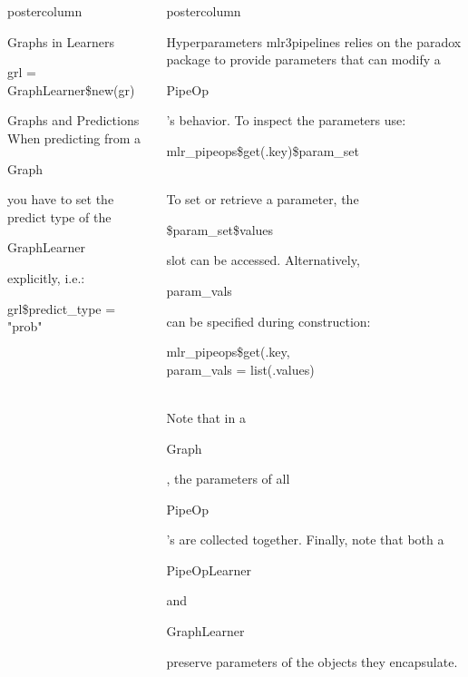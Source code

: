 \documentclass{beamer}
\newlength{\columnheight} %
\newcommand{\codeinline}[1]{\begin{codeboxinline}#1\end{codeboxinline}}
\begin{document}
\begin{frame}[fragile]{}
\begin{columns}
\begin{column}{.245\textwidth}
\begin{beamercolorbox}[center]{postercolumn}
\begin{minipage}{.98\textwidth}
{\begin{myblock}{Graphs in Learners}
              \begin{codebox}
                grl = GraphLearner\$new(gr)
              \end{codebox}
            \end{myblock}
            \begin{myblock}{Graphs and Predictions}
              When predicting from a \codeinline{Graph} you have to set the predict type of the \codeinline{GraphLearner} explicitly, i.e.:
              \begin{codebox}
                grl\$predict\_type = "prob"
              \end{codebox}
            \end{myblock}
						\vfill}
				\end{minipage}
			\end{beamercolorbox}
		\end{column}
    \begin{column}{.245\textwidth}
			\begin{beamercolorbox}[center]{postercolumn}
				\begin{minipage}{.98\textwidth}
					\parbox[t][\columnheight]{\textwidth}{
            \begin{myblock}{Hyperparameters}
              mlr3pipelines relies on the paradox package to provide parameters that can modify a \codeinline{PipeOp}'s behavior. To inspect the parameters use:
              \begin{codebox}
                mlr\_pipeops\$get(.key)\$param\_set
              \end{codebox}
              \ \\
              To set or retrieve a parameter, the \codeinline{\$param\_set\$values} slot can be accessed. Alternatively, \codeinline{param\_vals} can be specified during construction:
              \begin{codeboxmultiline}[width=17cm]
                mlr\_pipeops\$get(.key,\\
                \hspace*{1ex}param\_vals = list(.values)
              \end{codeboxmultiline}
              \ \\
              Note that in a \codeinline{Graph}, the parameters of all \codeinline{PipeOp}'s are collected together.
              Finally, note that both a \codeinline{PipeOpLearner} and \codeinline{GraphLearner} preserve parameters of the objects they encapsulate.
            \end{myblock}
						\vfill}
				\end{minipage}
			\end{beamercolorbox}
		\end{column}
	\end{columns}
\end{frame}
\end{document}
